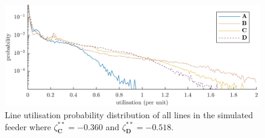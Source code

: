 \begin{figure}\centering
	\includegraphics{_chapter4/fig/utilisation-probability}
	\caption{Line utilisation probability distribution of all lines in the simulated feeder where $\zeta_\textbf{C}^{**}=-0.360$ and $\zeta_\textbf{D}^{**}=-0.518$.}
	\label{ch4:fig:utilisation-probability}
\end{figure}
